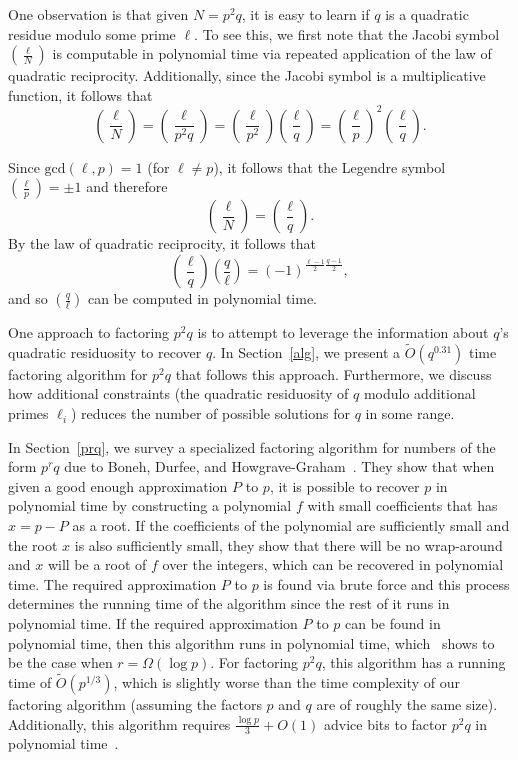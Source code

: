 \documentclass[letterpaper,twocolumn,10pt]{article}
\begin{document}
One observation is that given $N = p^2q$, it is easy to learn if $q$ is a quadratic residue modulo some prime $\ell$. To see this, we first note that the Jacobi symbol $\left(\frac{\ell}{N}\right)$ is computable in polynomial time via repeated application of the law of quadratic reciprocity. Additionally, since the Jacobi symbol is a multiplicative function, it follows that
\[
\left(\frac{\ell}{N}\right) = \left(\frac{\ell}{p^2q}\right) = \left(\frac{\ell}{p^2}\right) \left(\frac{\ell}{q}\right) = \left(\frac{\ell}{p}\right)^2 \left(\frac{\ell}{q}\right).
\]

Since $\text{gcd}(\ell,p) = 1$ (for $\ell \ne p$), it follows that the Legendre symbol $\left(\frac{\ell}{p}\right) = \pm 1$ and therefore
\[
\left(\frac{\ell}{N}\right) = \left(\frac{\ell}{q}\right).
\]
By the law of quadratic reciprocity, it follows that
\[
\left(\frac{\ell}{q}\right) \left(\frac{q}{\ell}\right) = (-1)^{\frac{\ell-1}{2} \frac{q-1}{2}}, 
\]
and so $\left(\frac{q}{\ell}\right)$ can be computed in polynomial time.

One approach to factoring $p^2 q$ is to attempt to leverage the information about $q$'s quadratic residuosity to recover $q$. In Section~\ref{alg}, we present a $\tilde{O}(q^{0.31})$ time factoring algorithm for $p^2 q$ that follows this approach. Furthermore, we discuss how additional constraints (the quadratic residuosity of $q$ modulo additional primes $\ell_i$) reduces the number of possible solutions for $q$ in some range.


In Section~\ref{prq}, we survey a specialized factoring algorithm for numbers of the form $p^r q$ due to Boneh, Durfee, and Howgrave-Graham~\cite{dan}. They show that when given a good enough approximation $P$ to $p$, it is possible to recover $p$ in polynomial time by constructing a polynomial $f$ with small coefficients that has $x = p - P$ as a root. If the coefficients of the polynomial are sufficiently small and the root $x$ is also sufficiently small, they show that there will be no wrap-around and $x$ will be a root of $f$ over the integers, which can be recovered in polynomial time. The required approximation $P$ to $p$ is found via brute force and this process determines the running time of the algorithm since the rest of it runs in polynomial time. If the required approximation $P$ to $p$ can be found in polynomial time, then this algorithm runs in polynomial time, which~\cite{dan} shows to be the case when $r = \Omega(\log p)$. For factoring $p^2 q$, this algorithm has a running time of $\tilde{O}(p^{1/3})$, which is slightly worse than the time complexity of our factoring algorithm (assuming the factors $p$ and $q$ are of roughly the same size). Additionally, this algorithm requires $\frac{\log p}{3} + O(1)$ advice bits to factor $p^2 q$ in polynomial time~\cite{dan}. 
\end{document}
